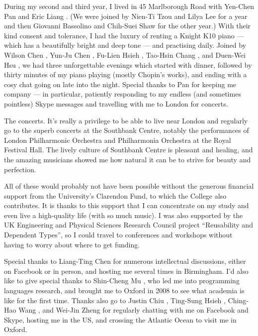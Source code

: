 \documentclass[dissertation]{subfiles}
\begin{document}
During my second and third year, I lived in 45 Marlborough Road with Yen-Chen Pan  and Eric Liang .
(We were joined by Nien-Ti Tzou  and Lilya Lee for a year and then Giovanni Bassolino and Chih-Suei Shaw  for the other year.)
With their kind consent and tolerance, I had the luxury of renting a Knight K10 piano --- which has a beautifully bright and deep tone --- and practising daily.
Joined by Wilson Chen , Yun-Ju Chen , Fu-Lien Hsieh , Tao-Hsin Chang , and Duen-Wei Hsu , we had three unforgettable evenings which started with dinner, followed by thirty minutes of my piano playing (mostly Chopin's works), and ending with a cosy chat going on late into the night.
Special thanks to Pan for keeping me company --- in particular, patiently responding to my endless (and sometimes pointless) Skype messages and travelling with me to London for concerts.

The concerts.
It's really a privilege to be able to live near London and regularly go to the superb concerts at the Southbank Centre, notably the performances of London Philharmonic Orchestra and Philharmonia Orchestra at the Royal Festival Hall.
The lively culture of Southbank Centre is pleasant and healing, and the amazing musicians showed me how natural it can be to strive for beauty and perfection.

All of these would probably not have been possible without the generous financial support from the University's Clarendon Fund, to which the College also contributes.
It is thanks to this support that I can concentrate on my study and even live a high-quality life (with so much music).
I was also supported by the UK Engineering and Physical Sciences Research Council project ``Reusability and Dependent Types'', so I could travel to conferences and workshops without having to worry about where to get funding.

Special thanks to Liang-Ting Chen  for numerous intellectual discussions, either on Facebook or in person, and hosting me several times in Birmingham.
I'd also like to give special thanks to Shin-Cheng Mu \kern1pt, who led me into programming languages research, and brought me to Oxford in 2008 to see what academia is like for the first time.
Thanks also go to Justin Chiu , Ting-Sung Hsieh , Ching-Hao Wang , and Wei-Jin Zheng  for regularly chatting with me on Facebook and Skype, hosting me in the US, and crossing the Atlantic Ocean to visit me in Oxford.
\end{document}
